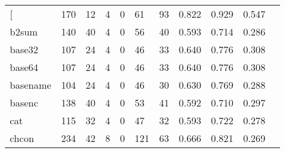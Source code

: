 \begin{longtable}{lp{1.10cm}p{1.10cm}p{1.10cm}p{1.10cm}p{1.10cm}p{1.10cm}p{1.10cm}p{1.10cm}p{1.10cm}p{1.10cm}}
\bottomrule
\endlastfoot
{[}         &                    170 &                                 12 &                                 4 &                                0 &                                61 &                              93 &                          0.822 &                                 0.929 &                               0.547 \\
b2sum     &                    140 &                                 40 &                                 4 &                                0 &                                56 &                              40 &                          0.593 &                                 0.714 &                               0.286 \\
base32    &                    107 &                                 24 &                                 4 &                                0 &                                46 &                              33 &                          0.640 &                                 0.776 &                               0.308 \\
base64    &                    107 &                                 24 &                                 4 &                                0 &                                46 &                              33 &                          0.640 &                                 0.776 &                               0.308 \\
basename  &                    104 &                                 24 &                                 4 &                                0 &                                46 &                              30 &                          0.630 &                                 0.769 &                               0.288 \\
basenc    &                    138 &                                 40 &                                 4 &                                0 &                                53 &                              41 &                          0.592 &                                 0.710 &                               0.297 \\
cat       &                    115 &                                 32 &                                 4 &                                0 &                                47 &                              32 &                          0.593 &                                 0.722 &                               0.278 \\
chcon     &                    234 &                                 42 &                                 8 &                                0 &                               121 &                              63 &                          0.666 &                                 0.821 &                               0.269 \\

\end{longtable}
